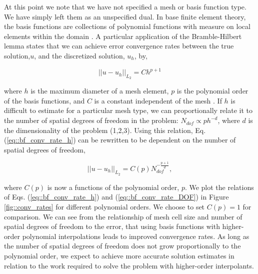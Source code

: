 \documentclass[11pt]{article}
\begin{document}
At this point we note that we have not specified a mesh or basis function type. We have simply left them as an unspecified dual. In base finite element theory, the basis functions are collections of polynomial functions with measure on local elements within the domain \cite{ern2013theory}. A particular application of the Bramble-Hilbert lemma states that we can achieve error convergence rates between the true solution,$u$, and the discretized solution, $u_h$, by,

\begin{equation}
\label{eq::bf_conv_rate_h}
|| u - u_h ||_{L_2} = C h^{p+1}
\end{equation}

\noindent where $h$ is the maximum diameter of a mesh element, $p$ is the polynomial order of the basis functions, and $C$ is a constant independent of the mesh \cite{bramble1970estimation}. If $h$ is difficult to estimate for a particular mesh type, we can proportionally relate it to the number of spatial degrees of freedom in the problem: $N_{dof} \propto p h^{-d}$, where $d$ is the dimensionality of the problem (1,2,3). Using this relation, Eq. (\ref{eq::bf_conv_rate_h}) can be rewritten to be dependent on the number of spatial degrees of freedom,

\begin{equation}
\label{eq::bf_conv_rate_DOF}
|| u - u_h ||_{L_2} = C(p) N_{dof}^{- \frac{p+1}{d}},
\end{equation}

\noindent where $C(p)$ is now a functions of the polynomial order, $p$. We plot the relations of Eqs. (\ref{eq::bf_conv_rate_h}) and (\ref{eq::bf_conv_rate_DOF}) in Figure \ref{fig::conv_rates} for different polynomial orders. We choose to set $C(p)=1$ for comparison. We can see from the relationship of mesh cell size and number of spatial degrees of freedom to the error, that using basis functions with higher-order polynomial interpolations leads to improved convergence rates. As long as the number of spatial degrees of freedom does not grow proportionally to the polynomial order, we expect to achieve more accurate solution estimates in relation to the work required to solve the problem with higher-order interpolants.
\end{document}
